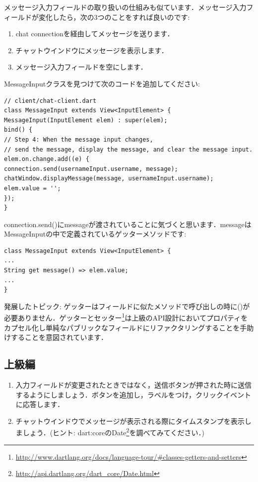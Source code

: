 メッセージ入力フィールドの取り扱いの仕組みも似ています．メッセージ入力フィールドが変化したら，次の3つのことをすれば良いのです:

\begin{enumerate}
\item chat connectionを経由してメッセージを送ります．
\item チャットウインドウにメッセージを表示します．
\item メッセージ入力フィールドを空にします．
\end{enumerate}

MessageInputクラスを見つけて次のコードを追加してください:

\begin{verbatim}
// client/chat-client.dart
class MessageInput extends View<InputElement> {
MessageInput(InputElement elem) : super(elem);
bind() {
// Step 4: When the message input changes,
// send the message, display the message, and clear the message input.
elem.on.change.add((e) {
connection.send(usernameInput.username, message);
chatWindow.displayMessage(message, usernameInput.username);
elem.value = '';
});
}
\end{verbatim}

connection.send()にmessageが渡されていることに気づくと思います．messageはMessageInputの中で定義されているゲッターメソッドです:

\begin{verbatim}
class MessageInput extends View<InputElement> {
...
String get message() => elem.value;
...
}
\end{verbatim}

発展したトピック: ゲッターはフィールドに似たメソッドで呼び出しの時に()が必要ありません．ゲッターとセッター\footnote{\url{http://www.dartlang.org/docs/language-tour/#classes-getters-and-setters}}は上級のAPI設計においてプロパティをカプセル化し単純なパブリックなフィールドにリファクタリングすることを手助けすることを意図されています．

\subsection{上級編}

\begin{enumerate}
\item 入力フィールドが変更されたときではなく，送信ボタンが押された時に送信するようにしましょう．ボタンを追加し，ラベルをつけ，クリックイベントに応答します．
\item チャットウインドウでメッセージが表示される際にタイムスタンプを表示しましょう．(ヒント: dart:coreのDate\footnote{\url{http://api.dartlang.org/dart_core/Date.html}}を調べてみてください．)
\end{enumerate}
